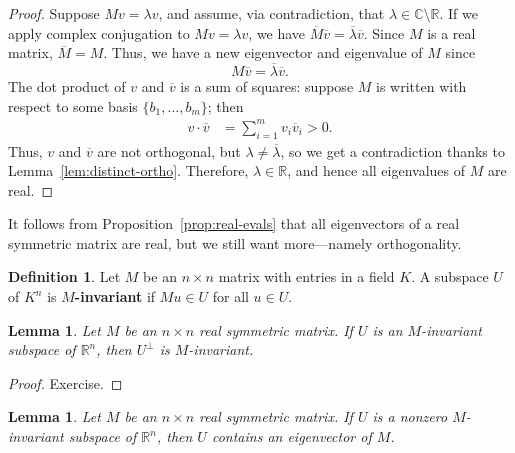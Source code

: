 \documentclass[a4paper, 12pt]{article}
\numberwithin{equation}{section}
\numberwithin{figure}{section}
\newtheorem{lem}[thm]{Lemma}
\theoremstyle{definition}
\newtheorem{defn}[thm]{Definition}
\newcommand{\R}{\mathbb{R}}
\newcommand{\C}{\mathbb{C}}
\newcommand{\WEEK}[1]{%
\hfill Week #1

\vspace{-1em}

\begin{center}
	\rule{\textwidth}{2pt}
\end{center}
\vspace{0.5em}%
}
\begin{document}
\begin{proof}
	Suppose $Mv = \lambda v$, and assume, via contradiction, that
	$\lambda\in\C\setminus \R$. If we apply complex conjugation to $Mv = \lambda
	v$, we have $\overline{M}\overline{v} = \overline{\lambda}\overline{v}$.
	Since $M$ is a real matrix, $\overline{M}=M$. Thus, we have a new
	eigenvector and eigenvalue of $M$ since 
	\[ 
		M \overline{v} = \overline{\lambda} \overline{v}. 
	\] 
	The dot product of $v$ and $\overline{v}$ is a sum of squares: suppose $M$
	is written with respect to some basis $\{b_1, \dots, b_m\}$; then 
	\begin{align*}
		v \cdot \overline{v} &= \sum_{i=1}^m v_i\overline{v}_i > 0.
	\end{align*}
	Thus, $v$ and $\overline{v}$ are not orthogonal, but $\lambda\neq
	\overline{\lambda}$, so we get a contradiction thanks to
	Lemma~\ref{lem:distinct-ortho}. Therefore, $\lambda\in\R$, and hence all
	eigenvalues of $M$ are real. 
\end{proof}

It follows from Proposition~\ref{prop:real-evals} that all eigenvectors of a real symmetric
matrix are real, but we still want more---namely orthogonality.


\begin{defn}
	Let $M$ be an $n\times n$ matrix with entries in a field $K$. A subspace $U$
	of $K^n$ is \textbf{$M$-invariant} if $Mu\in U$ for all $u\in U$.
\end{defn}

\begin{lem}\label{lem:perp-inv}
	Let $M$ be an $n\times n$ real symmetric matrix. If $U$ is an $M$-invariant
	subspace of $\R^n$, then $U^{\perp}$ is $M$-invariant.
\end{lem}

\begin{proof}
	Exercise.
\end{proof}

\begin{lem}\label{lem:eigenvector}
	Let $M$ be an $n\times n$ real symmetric matrix. If $U$ is a nonzero
	$M$-invariant subspace of $\R^n$, then $U$ contains an eigenvector of $M$.
\end{lem}
\end{document}
